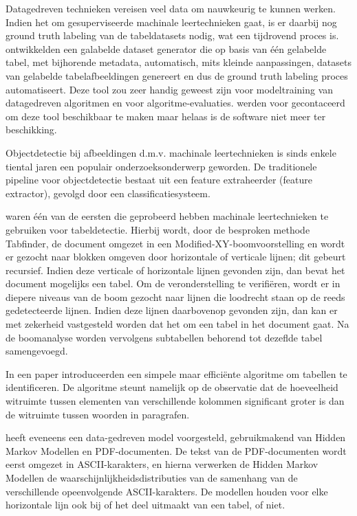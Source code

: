 Datagedreven technieken vereisen veel data om nauwkeurig te kunnen werken. Indien het om gesuperviseerde machinale leertechnieken gaat, is er daarbij nog ground truth labeling van de tabeldatasets nodig, wat een tijdrovend proces is. \textcite{Wangt2001} ontwikkelden een galabelde dataset generator die op basis van één gelabelde tabel, met bijhorende metadata, automatisch, mits kleinde aanpassingen, datasets van gelabelde tabelafbeeldingen genereert en dus de ground truth labeling proces automatiseert. Deze tool zou zeer handig geweest zijn voor modeltraining van datagedreven algoritmen en voor algoritme-evaluaties. \citeauthor{Wangt2001} werden voor gecontaceerd om deze tool beschikbaar te maken maar helaas is de software niet meer ter beschikking.

Objectdetectie bij afbeeldingen d.m.v. machinale leertechnieken is sinds enkele tiental jaren een populair onderzoeksonderwerp geworden. De traditionele pipeline voor objectdetectie bestaat uit een feature extraheerder (feature extractor), gevolgd door een classificatiesysteem.

\textcite{Cesarini2002} waren één van de eersten die geprobeerd hebben machinale leertechnieken te gebruiken voor tabeldetectie. Hierbij wordt, door de besproken methode Tabfinder, de document omgezet in een Modified-XY-boomvoorstelling en wordt er gezocht naar blokken omgeven door horizontale of verticale lijnen; dit gebeurt recursief. Indien deze verticale of horizontale lijnen gevonden zijn, dan bevat het document mogelijks een tabel. Om de veronderstelling te verifiëren, wordt er in diepere niveaus van de boom gezocht naar lijnen die loodrecht staan op de reeds gedetecteerde lijnen. Indien deze lijnen daarbovenop gevonden zijn, dan kan er met zekerheid vastgesteld worden dat het om een tabel in het document gaat. Na de boomanalyse worden vervolgens subtabellen behorend tot dezeflde tabel samengevoegd.

In een paper introduceerden \textcite{Mandal2006} een simpele maar efficiënte algoritme om tabellen te identificeren. De algoritme steunt namelijk op de observatie dat de hoeveelheid witruimte tussen elementen van verschillende kolommen significant groter is dan de witruimte tussen woorden in paragrafen.

\textcite{Silva2009} heeft eveneens een data-gedreven model voorgesteld, gebruikmakend van \Gls{Hidden Markov Model}len en PDF-documenten. De tekst van de PDF-documenten wordt eerst omgezet in ASCII-karakters, en hierna verwerken de \Gls{Hidden Markov Model}len de waarschijnlijkheidsdistributies van de samenhang van de verschillende opeenvolgende ASCII-karakters. De modellen houden voor elke horizontale lijn ook bij of het deel uitmaakt van een tabel, of niet.

